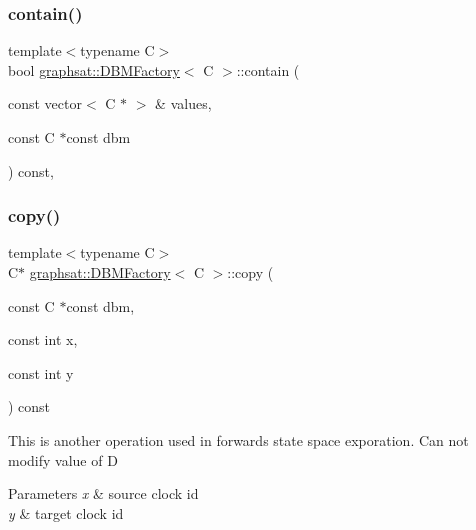 \subsubsection{\texorpdfstring{contain()}{contain()}}
{\footnotesize\ttfamily template$<$typename C$>$ \\
bool \mbox{\hyperlink{classgraphsat_1_1_d_b_m_factory}{graphsat\+::\+D\+B\+M\+Factory}}$<$ C $>$\+::contain (\begin{DoxyParamCaption}\item[{const vector$<$ C $\ast$ $>$ \&}]{values,  }\item[{const C $\ast$const}]{dbm }\end{DoxyParamCaption}) const\hspace{0.3cm}{\ttfamily [inline]}, {\ttfamily [private]}}

\mbox{\label{classgraphsat_1_1_d_b_m_factory_a00df8b7374daa8bb0e3b9fd1e0aa20a9}} 
\subsubsection{\texorpdfstring{copy()}{copy()}}
{\footnotesize\ttfamily template$<$typename C$>$ \\
C$\ast$ \mbox{\hyperlink{classgraphsat_1_1_d_b_m_factory}{graphsat\+::\+D\+B\+M\+Factory}}$<$ C $>$\+::copy (\begin{DoxyParamCaption}\item[{const C $\ast$const}]{dbm,  }\item[{const int}]{x,  }\item[{const int}]{y }\end{DoxyParamCaption}) const\hspace{0.3cm}{\ttfamily [inline]}}

This is another operation used in forwards state space exporation. Can not modify value of D 
\begin{DoxyParams}{Parameters}
{\em x} & source clock id \\
\hline
{\em y} & target clock id \\
\hline
\end{DoxyParams}
\mbox{\label{classgraphsat_1_1_d_b_m_factory_abcccc3e053ac100dc3ded9411bb4186f}} 
